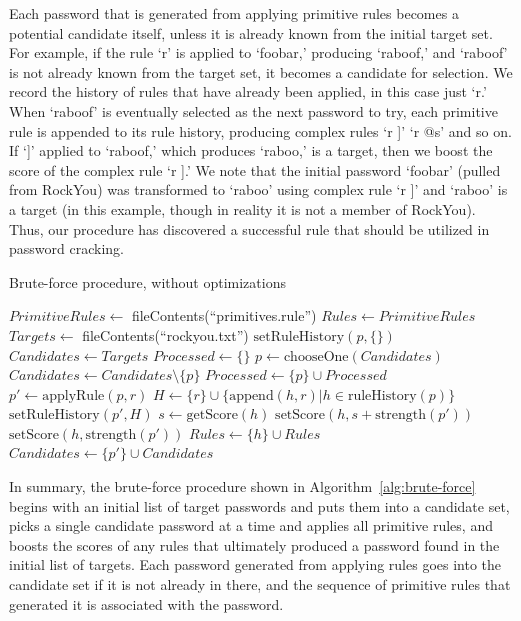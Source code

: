 \documentclass{article}
\begin{document}
Each password that is generated from applying primitive rules becomes a
potential candidate itself, unless it is already known from the initial target
set. For example, if the rule `r' is applied to `foobar,' producing `raboof,'
and `raboof' is not already known from the target set, it becomes a candidate
for selection. We record the history of rules that have already been applied, in
this case just `r.' When `raboof' is eventually selected as the next password to
try, each primitive rule is appended to its rule history, producing complex
rules `r ]' `r @s' and so on. If `]' applied to `raboof,' which produces
`raboo,' is a target, then we boost the score of the complex rule `r ].' We note
that the initial password `foobar' (pulled from RockYou) was transformed to
`raboo' using complex rule `r ]' and `raboo' is a target (in this example,
though in reality it is not a member of RockYou). Thus, our procedure has
discovered a successful rule that should be utilized in password cracking.

\begin{algorithm}[t!]\caption{Brute-force procedure, without optimizations}
\begin{algorithmic}[1]
\State $PrimitiveRules \gets $ fileContents(``primitives.rule'')
\State $Rules \gets PrimitiveRules$
\State $Targets \gets $ fileContents(``rockyou.txt'')
  \State $\mathrm{setRuleHistory}(p, \{\})$
\EndFor
\State $Candidates \gets Targets$
\State $Processed \gets \{\}$
  \State $p \gets \mathrm{chooseOne}(Candidates)$
  \State $Candidates \gets Candidates \setminus \{p\}$
  \State $Processed \gets \{p\} \cup Processed$
    \State $p' \gets \mathrm{applyRule}(p, r)$
    \State $H \gets \{r\}\cup\{\mathrm{append}(h, r)|h \in
\mathrm{ruleHistory}(p)\}$
    \State $\mathrm{setRuleHistory}(p', H)$
          \State $s \gets \mathrm{getScore}(h)$
          \State $\mathrm{setScore}(h,
s+\mathrm{strength}(p'))$
        \Else
          \State $\mathrm{setScore}(h, \mathrm{strength}(p'))$
          \State $Rules \gets \{h\}\cup Rules$
        \EndIf
      \EndFor
    \EndIf
      \State $Candidates \gets \{p'\}\cup Candidates$
    \EndIf
  \EndFor
\EndWhile
\end{algorithmic}
\label{alg:brute-force}
\end{algorithm}

In summary, the brute-force procedure shown in
Algorithm~\ref{alg:brute-force} begins with an initial list of target
passwords and puts them into a candidate set, picks a single candidate password
at a time and applies all primitive rules, and boosts the scores of any rules
that ultimately produced a password found in the initial list of targets. Each
password generated from applying rules goes into the candidate set if it is not
already in there, and the sequence of primitive rules that generated it is
associated with the password.
\end{document}

